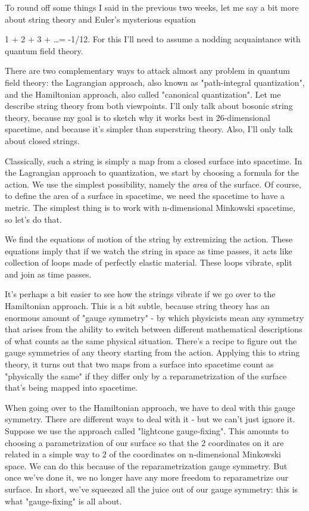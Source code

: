 


To round off some things I said in the previous two weeks, let me
say a bit more about string theory and Euler's mysterious equation

                      1 + 2 + 3 + \ldots  = -1/12.  
For this I'll need to assume a nodding acquaintance with quantum field 
theory.   

There are two complementary ways to attack almost any problem in 
quantum field theory: the Lagrangian approach, also known as 
"path-integral quantization", and the Hamiltonian approach, 
also called
"canonical quantization".  Let me describe string theory from both 
viewpoints.  I'll only talk about bosonic string theory, because my goal
is to sketch why it works best in 26-dimensional spacetime, and because
it's simpler than superstring theory.  Also, I'll only talk about
closed strings.  

Classically, such a string is simply a map from a closed surface into
spacetime.   In the Lagrangian approach to quantization, we start by
choosing a formula for the action.  We use the simplest possibility,
namely the \emph{area} of the surface.  Of course, to define the area of a
surface in spacetime, we need the spacetime to have a metric.  The
simplest thing is to work with n-dimensional Minkowski spacetime, so
let's do that.

We find the equations of motion of the string by extremizing the action.
These equations imply that if we watch the string in space as time 
passes, it acts like collection of loops made of perfectly elastic
material.  These loops vibrate, split and join as time passes. 

It's perhaps a bit easier to see how the strings vibrate if we go over
to the Hamiltonian approach.  This is a bit subtle, because string theory
has an enormous amount of "gauge symmetry" - by which physicists mean
any symmetry that arises from the ability to switch between different
mathematical descriptions of what counts as the same physical situation.
There's a recipe to figure out the gauge symmetries of any theory
starting from the action.  Applying this to string theory,  it turns out
that two maps from a surface into spacetime count as "physically the
same" if they differ only by a reparametrization of the surface that's
being mapped into spacetime.  

When going over to the Hamiltonian approach, we have to deal with this
gauge symmetry.  There are different ways to deal with it - but we
can't just ignore it.  Suppose we use the approach called "lightcone
gauge-fixing".  This amounts to choosing a parametrization of our 
surface so that the 2 coordinates on it are related in a simple way to
2 of the coordinates on n-dimensional Minkowski space.  We can do this
because of the reparametrization gauge symmetry.  But once we've done
it, we no longer have any more freedom to reparametrize our surface.  In
short, we've squeezed all the juice out of our gauge symmetry: this is
what "gauge-fixing" is all about.

